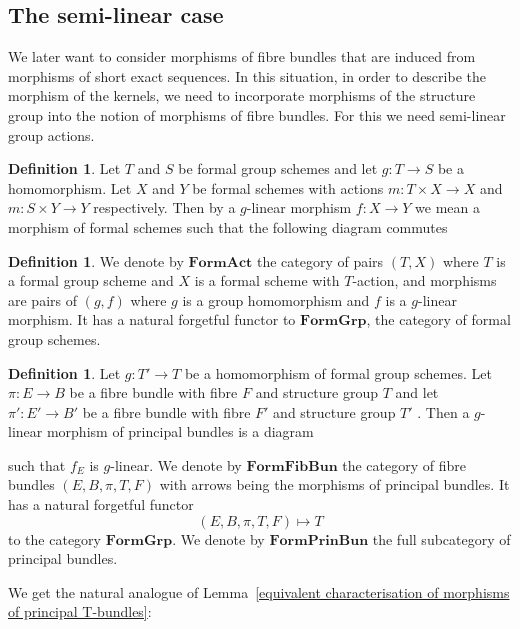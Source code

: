 \documentclass[10pt,oneside]{amsart}
\theoremstyle{definition}
\newtheorem{definition}[theorem]{Definition}
\begin{document}
	\subsection{The semi-linear case}
	We later want to consider morphisms of fibre bundles that are induced from morphisms of short exact sequences. In this situation, in order to describe the morphism of the kernels, we need to incorporate morphisms of the structure group into the notion of morphisms of fibre bundles. For this we need semi-linear group actions.
	\begin{definition}
		Let $T$ and $S$ be formal group schemes and let $g:T\rightarrow S$ be a homomorphism. Let $X$ and $Y$ be formal schemes with actions $m:T\times X\rightarrow X$ and $m:S\times Y\rightarrow Y$ respectively. Then by a $g$-linear morphism $f:X\rightarrow Y$ we mean a morphism of formal schemes such that the following diagram commutes
		\begin{center}
		\end{center}
	\end{definition}
	
	\begin{definition}
		We denote by $\mathbf{FormAct}$ the category of pairs $(T,X)$ where $T$ is a formal group scheme and $X$ is a formal scheme with $T$-action, and morphisms are pairs of $(g,f)$ where $g$ is a group homomorphism and $f$ is a $g$-linear morphism. It has a natural forgetful functor to $
		\mathbf{FormGrp}$, the category of formal group schemes.
	\end{definition}
	
	\begin{definition}
		Let $g:T'\rightarrow T$ be a homomorphism of formal group schemes. Let $\pi:E\rightarrow B$ be a fibre bundle with fibre $F$ and structure group $T$ and let $\pi':E'\rightarrow B'$ be a fibre bundle with fibre $F'$ and structure group $T'$ . Then a $g$-linear morphism of principal bundles is a diagram
		\begin{center}
		\end{center}		
		such that $f_E$ is $g$-linear. We denote by $\mathbf{ FormFibBun}$ the category of fibre bundles $(E,B,\pi,T,F)$ with arrows being the morphisms of principal bundles. It has a natural forgetful functor \[(E,B,\pi,T,F) \mapsto T\]
		to the category $\mathbf{FormGrp}$. We denote by $\mathbf{FormPrinBun}$ the full subcategory of principal bundles.
	\end{definition}
	We get the natural analogue of Lemma~\ref{equivalent characterisation of morphisms of principal T-bundles}:
	
\end{document}
